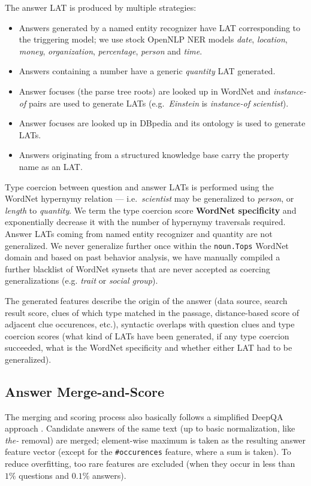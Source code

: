 \documentclass{poster15}
\begin{document}
The answer LAT is produced by multiple strategies:
\begin{itemize}
	\item Answers generated by a named entity recognizer have LAT corresponding to the triggering model;
		we use stock OpenNLP NER models \textit{date}, \textit{location}, \textit{money}, \textit{organization}, \textit{percentage}, \textit{person} and \textit{time}.
	\item Answers containing a number have a generic \textit{quantity} LAT generated.
	\item Answer focuses (the parse tree roots) are looked up in WordNet and \textit{instance-of} pairs are used to generate LATs (e.g.\ \textit{Einstein} is \textit{instance-of} \textit{scientist}).
	\item Answer focuses are looked up in DBpedia and its ontology is used to generate LATs.
	\item Answers originating from a structured knowledge base carry the property name as an LAT.
\end{itemize}

Type coercion between question and answer LATs is performed using the WordNet
hypernymy relation --- i.e.\ \textit{scientist} may be generalized to \textit{person}, or \textit{length} to \textit{quantity}.
We term the type coercion score \textbf{WordNet specificity} and exponentially decrease it
with the number of hypernymy traversals required.
Answer LATs coming from named entity recognizer and quantity are not generalized.
We never generalize further once within the \texttt{noun.Tops} WordNet domain and
based on past behavior analysis, we have manually compiled a further blacklist
of WordNet synsets that are never accepted as coercing generalizations
(e.g. \textit{trait} or \textit{social group}).

The generated features describe the origin of the answer (data source, search result score, clues of which type matched in the passage, distance-based score of adjacent clue occurences, etc.), syntactic overlaps with question clues and type coercion scores (what kind of LATs have been generated, if any type coercion succeeded, what is the WordNet specificity and whether either LAT had to be generalized).

\subsection{Answer Merge-and-Score}

The merging and scoring process also basically follows a simplified DeepQA approach \cite{WatsonScoring}.
Candidate answers of the same text (up to basic normalization, like \textit{the-} removal) are merged;
element-wise maximum is taken as the resulting answer feature vector
(except for the \texttt{\#occurences} feature, where a sum is taken).
To reduce overfitting, too rare features are excluded
(when they occur in less than $1\%$ questions and $0.1\%$ answers).
\end{document}
